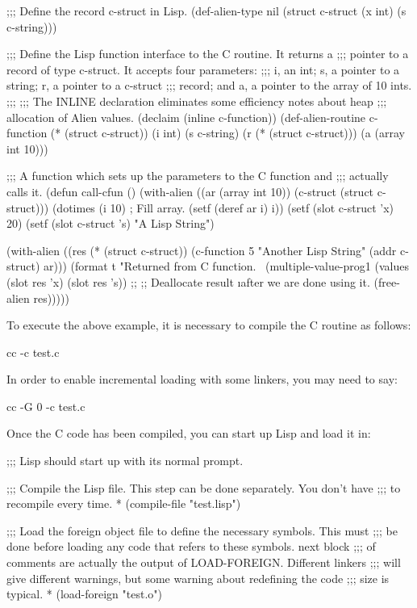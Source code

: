 {\begin{lisp}
;;; Define the record c-struct in Lisp.
(def-alien-type nil
    (struct c-struct
	    (x int)
	    (s c-string)))

;;; Define the Lisp function interface to the C routine.  It returns a
;;; pointer to a record of type c-struct.  It accepts four parameters:
;;; i, an int; s, a pointer to a string; r, a pointer to a c-struct
;;; record; and a, a pointer to the array of 10 ints.
;;;
;;; The INLINE declaration eliminates some efficiency notes about heap
;;; allocation of Alien values.
(declaim (inline c-function))
(def-alien-routine c-function
    (* (struct c-struct))
  (i int)
  (s c-string)
  (r (* (struct c-struct)))
  (a (array int 10)))

;;; A function which sets up the parameters to the C function and
;;; actually calls it.
(defun call-cfun ()
  (with-alien ((ar (array int 10))
	       (c-struct (struct c-struct)))
    (dotimes (i 10)                     ; Fill array.
      (setf (deref ar i) i))
    (setf (slot c-struct 'x) 20)
    (setf (slot c-struct 's) "A Lisp String")

    (with-alien ((res (* (struct c-struct))
		      (c-function 5 "Another Lisp String" (addr c-struct) ar)))
      (format t "Returned from C function.~%
      (multiple-value-prog1
	  (values (slot res 'x)
		  (slot res 's))
	;;		
	;; Deallocate result \i{after} we are done using it.
	(free-alien res)))))
\end{lisp}
To execute the above example, it is necessary to compile the C routine as
follows:
\begin{example}
cc -c test.c
\end{example}
In order to enable incremental loading with some linkers, you may need to say:
\begin{example}
cc -G 0 -c test.c
\end{example}
Once the C code has been compiled, you can start up Lisp and load it in:
\begin{example}
;;; Lisp should start up with its normal prompt.

;;; Compile the Lisp file.  This step can be done separately.  You don't have
;;; to recompile every time.
* (compile-file "test.lisp")

;;; Load the foreign object file to define the necessary symbols.  This must
;;; be done before loading any code that refers to these symbols.  next block
;;; of comments are actually the output of LOAD-FOREIGN.  Different linkers
;;; will give different warnings, but some warning about redefining the code
;;; size is typical.
* (load-foreign "test.o")


\end{example}}
